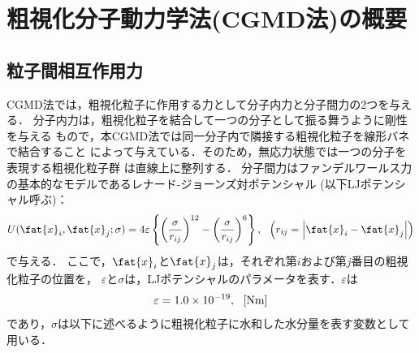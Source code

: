 ﻿\section{粗視化分子動力学法(CGMD法)の概要}
\subsection{粒子間相互作用力}
CGMD法では，粗視化粒子に作用する力として分子内力と分子間力の2つを与える．
分子内力は，粗視化粒子を結合して一つの分子として振る舞うように剛性を与える
もので，本CGMD法では同一分子内で隣接する粗視化粒子を線形バネで結合すること
によって与えている．そのため，無応力状態では一つの分子を表現する粗視化粒子群
は直線上に整列する．
分子間力はファンデルワールス力の基本的なモデルであるレナード-ジョーンズ対ポテンシャル
(以下LJポテンシャル呼ぶ)：
\begin{equation}
	U(\fat{x}_i,\fat{x}_j; \sigma) 
	= 4 \varepsilon 
	\left\{ 
	\left(\frac{\sigma}{r_{ij}}\right)^{12}
	-
	\left(\frac{\sigma}{r_{ij}}\right)^6
	\right\}, \ \ \left( r_{ij}=\left| \fat{x}_i-\fat{x}_j\right| \right)
	\label{eqn:LJ}
\end{equation}
で与える．
ここで，$\fat{x}_i$と$\fat{x}_j$は，それぞれ第$i$および第$j$番目の粗視化粒子の位置を，
$\varepsilon$と$\sigma$は，LJポテンシャルのパラメータを表す．$\varepsilon$は
\begin{equation}
	\varepsilon=1.0\times 10^{-19}, \ \ [{\rm Nm}]
	\label{eqn:eps_of_LJ}
\end{equation}
であり，$\sigma$は以下に述べるように粗視化粒子に水和した水分量を表す変数として用いる．

